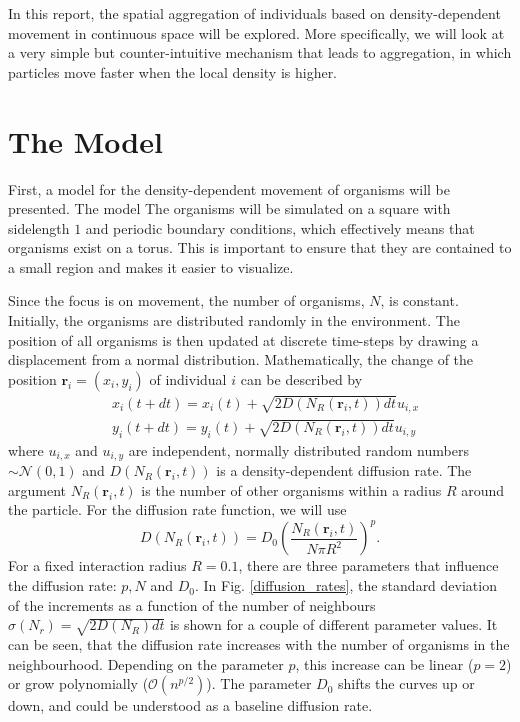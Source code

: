 \documentclass{article}
\renewcommand{\vec}[1]{\boldsymbol{#1}}
\begin{document}
In this report, the spatial aggregation of individuals based on density-dependent movement in continuous space will be explored.
More specifically, we will look at a very simple but counter-intuitive mechanism that leads to aggregation, in which particles move faster when the local density is higher. 


\section{The Model}
First, a model for the density-dependent movement of organisms will be presented. 
The model 
The organisms will be simulated on a square with sidelength $1$ and periodic boundary conditions, which effectively means that organisms exist on a torus.
This is important to ensure that they are contained to a small region and makes it easier to visualize.

Since the focus is on movement, the number of organisms, $N$, is constant.
Initially, the organisms are distributed randomly in the environment. 
The position of all organisms is then updated at discrete time-steps by drawing a displacement from a normal distribution.
Mathematically, the change of the position $\vec{r}_i = (x_i, y_i)$ of individual $i$ can be described by
\begin{align}
    & x_i(t + dt) = x_i(t) + \sqrt{2D(N_R(\vec{r}_i, t)) dt} u_{i,x} \\
    & y_i(t + dt) = y_i(t) + \sqrt{2D(N_R(\vec{r}_i, t)) dt} u_{i,y}
\end{align}
where $u_{i,x}$ and $u_{i,y}$ are independent, normally distributed random numbers $\sim \mathcal{N}(0,1)$ and $D(N_R(\vec{r}_i, t))$ is a density-dependent diffusion rate.
The argument $N_R(\vec{r}_i, t)$ is the number of other organisms within a radius $R$ around the particle. 
For the diffusion rate function, we will use
\begin{equation}
    D(N_R(\vec{r}_i, t)) = D_0\left( \frac{N_R(\vec{r}_i, t)}{N\pi R^2} \right)^p.
\end{equation}
For a fixed interaction radius $R=0.1$, there are three parameters that influence the diffusion rate: $p, N$ and $D_0$.
In Fig. \ref{diffusion_rates}, the standard deviation of the increments as a function of the number of neighbours $\sigma(N_r) = \sqrt{2D(N_R) dt}$ is shown for a couple of different parameter values.
It can be seen, that the diffusion rate increases with the number of organisms in the neighbourhood.
Depending on the parameter $p$, this increase can be linear ($p=2$) or grow polynomially ($\mathcal{O}(n^{p/2})$). 
The parameter $D_0$ shifts the curves up or down, and could be understood as a baseline diffusion rate.
\end{document}
